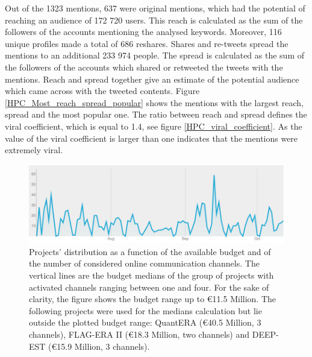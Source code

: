 Out of the 1323 mentions, 637 were original mentions, which had the potential of reaching an audience of 172 720 users. This reach is calculated as the sum of the followers of the accounts mentioning the analysed keywords. Moreover, 116 unique profiles made a total of 686 reshares. Shares and re-tweets spread the mentions to an additional 233 974 people. The spread is calculated as the sum of the followers of the accounts which shared or retweeted the tweets with the mentions. Reach and spread together give an estimate of the potential audience which came across with the tweeted contents. Figure \ref{HPC_Most_reach_spread_popular} shows the mentions with the largest reach, spread and the most popular one. The ratio between reach and spread defines the viral coefficient, which is equal to 1.4, see figure \ref{HPC_viral_coefficient}. As the value of the viral coefficient is larger than one indicates that the mentions were extremely viral. 

\begin{figure}[!t] 
 \begin{center}
 \includegraphics[scale=0.4]{Images/NUVI_time_distribution.png}
 \caption{Projects' distribution as a function of the available budget and of the number of considered online communication channels. The vertical lines are the budget medians of the group of projects with activated channels ranging between one and four. For the sake of clarity, the figure shows the budget range up to \euro 11.5 Million. The following projects were used for the medians calculation but lie outside the plotted budget range: QuantERA (\euro 40.5 Million, 3 channels), FLAG-ERA II (\euro 18.3 Million, two channels) and DEEP-EST (\euro 15.9 Million, 3 channels).}
 \label{NUVI_time_distribution}
 \end{center}
\end{figure}

